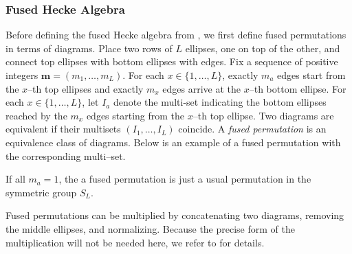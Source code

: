 \documentclass[12pt]{ximera}
\begin{document}
\subsubsection{Fused Hecke Algebra }
Before defining the fused Hecke algebra from \cite{crampe2020fused}, we first define fused permutations in terms of diagrams. Place two rows of $L$ ellipses, one on top of the other, and connect top ellipses with bottom ellipses with edges. Fix a sequence of positive integers $\mathbf{m}=(m_1,\ldots,m_L)$. For each $x \in \{1,\ldots,L\}$, exactly $m_a$ edges start from the $x$--th top ellipses and exactly $m_x$ edges arrive at the $x$--th bottom ellipse. For each $x \in \{1,\ldots,L\}$, let $I_a$ denote the multi-set indicating the bottom ellipses reached by the $m_x$ edges starting from the $x$--th top ellipse. Two diagrams are equivalent if their multisets $(I_1,\ldots,I_L)$ coincide. A \textit{fused permutation} is an equivalence class of diagrams. Below is an example of a fused permutation with the corresponding multi--set.

\begin{center}
\end{center}
If all $m_a=1$, the a fused permutation is just a usual permutation in the symmetric group $S_L$.

Fused permutations can be multiplied by concatenating two diagrams, removing the middle ellipses, and normalizing. Because the precise form of the multiplication will not be needed here, we refer to \cite{crampe2020fused} for details. 
\end{document}
